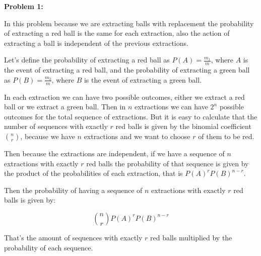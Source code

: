 \textbf{Problem 1:}

\singlespacing

In this problem because we are extracting balls with replacement
the probability of extracting a red ball is the same for each extraction, also
the action of extracting a ball is independent of the previous extractions.

\singlespacing

Let's define the probability of extracting a red ball as $P(A) = \frac{m_1}{m}$, where
$A$ is the event of extracting a red ball, and the probability of extracting a green ball as $P(B) = \frac{m_2}{m}$, where
$B$ is the event of extracting a green ball.

\singlespacing

In each extraction we can have two possible outcomes, either we extract a red ball
or we extract a green ball. Then in $n$ extractions we can have $2^n$ possible outcomes for
the total sequence of extractions. But it is easy to calculate that the number of sequences
with exactly $r$ red balls is given by the binomial coefficient $\binom{n}{r}$, because
we have $n$ extractions and we want to choose $r$ of them to be red.

\singlespacing

Then because the extractions are independent, if we have a sequence of $n$ extractions
with exactly $r$ red balls the probability of that sequence is given by the product of the
probabilities of each extraction, that is $P(A)^r P(B)^{n-r}$.

\singlespacing

Then the probability of having a sequence of $n$ extractions with exactly $r$ red balls is given by:

\singlespacing

\begin{equation}
    \binom{n}{r} P(A)^r P(B)^{n-r}
\end{equation}

\singlespacing

That's the amount of sequences with exactly $r$ red balls multiplied by the probability of each sequence.
